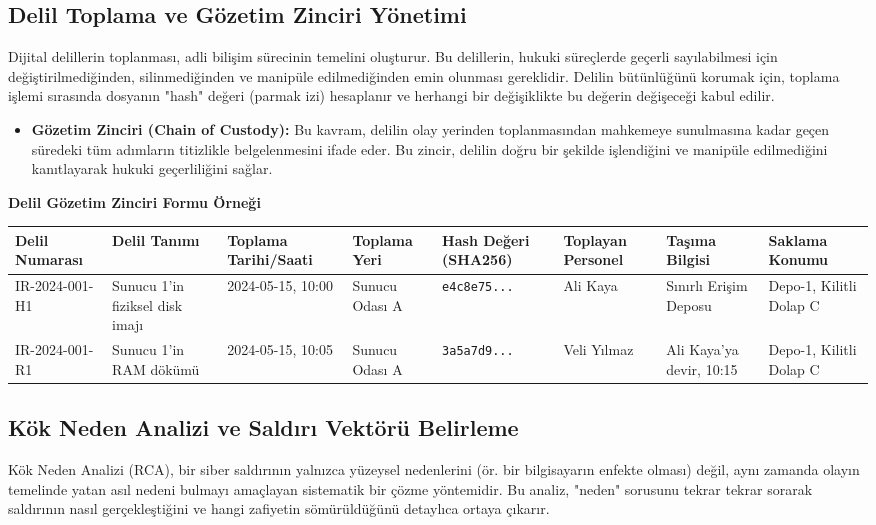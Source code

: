\begin{itemize}
\begin{itemize}
\subsection{Delil Toplama ve Gözetim Zinciri Yönetimi}

Dijital delillerin toplanması, adli bilişim sürecinin temelini oluşturur. Bu delillerin, hukuki süreçlerde geçerli sayılabilmesi için değiştirilmediğinden, silinmediğinden ve manipüle edilmediğinden emin olunması gereklidir. Delilin bütünlüğünü korumak için, toplama işlemi sırasında dosyanın "hash" değeri (parmak izi) hesaplanır ve herhangi bir değişiklikte bu değerin değişeceği kabul edilir.

\begin{itemize}
    \item \textbf{Gözetim Zinciri (Chain of Custody):} Bu kavram, delilin olay yerinden toplanmasından mahkemeye sunulmasına kadar geçen süredeki tüm adımların titizlikle belgelenmesini ifade eder. Bu zincir, delilin doğru bir şekilde işlendiğini ve manipüle edilmediğini kanıtlayarak hukuki geçerliliğini sağlar.
\end{itemize}

\textbf{Delil Gözetim Zinciri Formu Örneği}

\begin{tabular}{|l|l|l|l|l|l|l|l|}
\hline
Delil Numarası & Delil Tanımı & Toplama Tarihi/Saati & Toplama Yeri & Hash Değeri (SHA256) & Toplayan Personel & Taşıma Bilgisi & Saklama Konumu \\
\hline

IR-2024-001-H1 & Sunucu 1'in fiziksel disk imajı & 2024-05-15, 10:00 & Sunucu Odası A & \texttt{e4c8e75...} & Ali Kaya & Sınırlı Erişim Deposu & Depo-1, Kilitli Dolap C \\
\hline
IR-2024-001-R1 & Sunucu 1'in RAM dökümü & 2024-05-15, 10:05 & Sunucu Odası A & \texttt{3a5a7d9...} & Veli Yılmaz & Ali Kaya'ya devir, 10:15 & Depo-1, Kilitli Dolap C \\
\hline
\end{tabular}
\end{itemize}

\subsection{Kök Neden Analizi ve Saldırı Vektörü Belirleme}

Kök Neden Analizi (RCA), bir siber saldırının yalnızca yüzeysel nedenlerini (ör. bir bilgisayarın enfekte olması) değil, aynı zamanda olayın temelinde yatan asıl nedeni bulmayı amaçlayan sistematik bir çözme yöntemidir. Bu analiz, "neden" sorusunu tekrar tekrar sorarak saldırının nasıl gerçekleştiğini ve hangi zafiyetin sömürüldüğünü detaylıca ortaya çıkarır.


\end{itemize}
